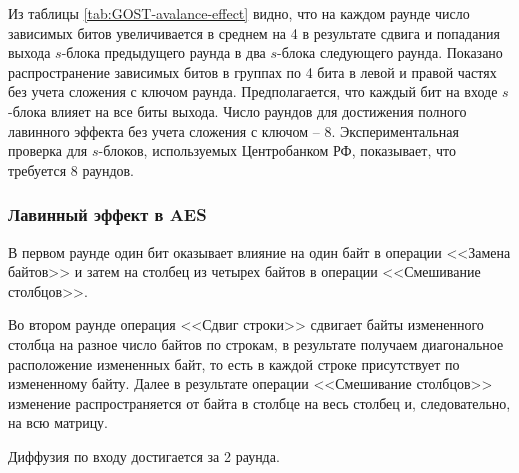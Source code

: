 Из таблицы \ref{tab:GOST-avalance-effect} видно, что на каждом раунде число зависимых битов увеличивается в среднем на 4 в результате сдвига и попадания выхода $s$-блока предыдущего раунда в два $s$-блока следующего раунда. Показано распространение зависимых битов в группах по 4 бита в левой и правой частях без учета сложения с ключом раунда. Предполагается, что каждый бит на входе $s$-блока влияет на все биты выхода. Число раундов для достижения полного лавинного эффекта без учета сложения с ключом -- 8. Экспериментальная проверка для $s$-блоков, используемых Центробанком РФ, показывает, что требуется 8 раундов.


\subsubsection{Лавинный эффект в AES}

В первом раунде один бит оказывает влияние на один байт в операции <<Замена байтов>> и затем на столбец из четырех байтов в операции <<Смешивание столбцов>>.

Во втором раунде операция <<Сдвиг строки>> сдвигает байты измененного столбца на разное число байтов по строкам, в результате получаем диагональное расположение измененных байт, то есть в каждой строке присутствует по измененному байту. Далее в результате операции <<Смешивание столбцов>> изменение распространяется от байта в столбце на весь столбец и, следовательно, на всю матрицу.

Диффузия по входу достигается за 2 раунда.
